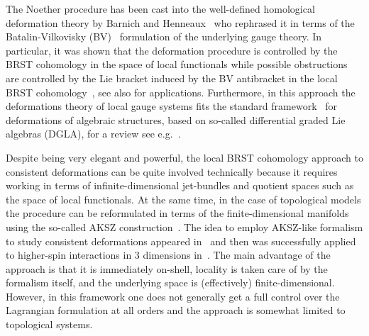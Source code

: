 \documentclass[a4paper,12pt]{article}
\numberwithin{equation}{section} %
\begin{document}
The Noether procedure has been cast into the well-defined homological deformation theory by Barnich and Henneaux~\cite{Barnich:1993vg} who rephrased it in terms of the Batalin-Vilkovisky (BV)~\cite{Batalin:1981jr,Batalin:1983wj} formulation of the underlying gauge theory. In particular, it was shown that the deformation procedure is controlled by the BRST cohomology in the space of local functionals while possible  obstructions are controlled by the Lie bracket induced by the BV antibracket in the local BRST cohomology~\cite{Barnich:1993pa,Henneaux:1997bm,Barnich:2000me}, see also \cite{Henneaux:1997ha,Barnich:2001mc,Bekaert:2002uh,Boulanger:2006gr} for applications. Furthermore, in this approach the deformations theory of local gauge systems fits the standard framework~\cite{Gerstenhaber:1964,Kontsevich:1997vb} for deformations of algebraic structures, based on so-called differential graded Lie algebras (DGLA), for a review see e.g.~\cite{Manetti2005}. 

Despite being very elegant and powerful, the local BRST cohomology approach to consistent deformations can be quite involved technically because it requires working in terms of infinite-dimensional jet-bundles and 
quotient spaces such as the space of local functionals. At the same time, in the case of topological models the procedure can be reformulated in terms of the finite-dimensional manifolds using the so-called AKSZ construction~\cite{Alexandrov:1995kv}. The idea to employ AKSZ-like formalism to study consistent deformations appeared in~\cite{Barnich:2009jy} and then was successfully applied to higher-spin interactions in 3 dimensions in~\cite{Grigoriev:2019xmp,Grigoriev:2020lzu}. The main advantage of the approach is that it is immediately on-shell,  locality is taken care of by the formalism itself, and the underlying space is (effectively) finite-dimensional. However, in this framework  one does not generally get a full control over the Lagrangian formulation at all orders and the approach is somewhat limited to topological systems. 
\end{document}
